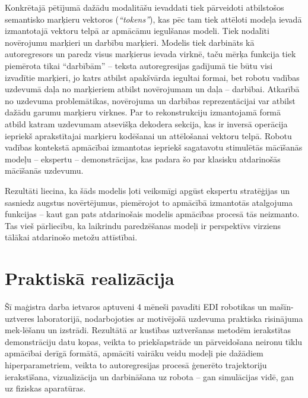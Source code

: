 \documentclass[12pt, a4paper]{article}
\numberwithin{equation}{section} %
\begin{document}
Konkrētajā pētījumā dažādu modalitāšu ievaddati tiek pārveidoti atbilstošos semantisko marķieru vektoros (\textit{``tokens''}), kas pēc tam tiek attēloti modeļa ievadā izmantotajā vektoru telpā ar apmācāmu iegulšanas modeli. Tiek nodalīti novērojumu marķieri un darbību marķieri. Modelis tiek darbināts kā autoregresors un paredz visus marķierus ievada virknē, taču mērķa funkcija tiek piemērota tikai ``darbībām'' -- teksta autoregresijas gadījumā tie būtu visi izvadītie marķieri, jo katrs atbilst apakšvārda iegultai formai, bet robotu vadības uzdevumā daļa no marķieriem atbilst novērojumam un daļa -- darbībai. Atkarībā no uzdevuma problemātikas, novērojuma un darbības reprezentācijai var atbilst dažādu garumu marķieru virknes. Par to rekonstrukciju izmantojamā formā atbild katram uzdevumam atsevišķa dekodera sekcija, kas ir inversā operācija iepriekš aprakstītajai marķieru kodēšanai un attēlošanai vektoru telpā. Robotu vadības kontekstā apmācībai izmantotas iepriekš sagatavotu stimulētās mācīšanās modeļu -- ekspertu -- demonstrācijas, kas padara šo par klasisku atdarinošās mācīšanās uzdevumu. 

Rezultāti liecina, ka šāds modelis ļoti veiksmīgi apgūst ekspertu stratēģijas un sasniedz augstus novērtējumus, piemērojot to apmācībā izmantotās atalgojuma funkcijas -- kaut gan pats atdarinošais modelis apmācības procesā tās neizmanto. Tas vieš pārliecību, ka laikrindu paredzēšanas modeļi ir perspektīvs virziens tālākai atdarinošo metožu attīstībai.



%
%
%
%
%
%
%
%
%
%
%
%
%
%
%
%
%
%
%

\newpage
\section{Praktiskā realizācija}

Šī maģistra darba ietvaros aptuveni 4 mēneši pavadīti EDI robotikas un mašīn-uztveres laboratorijā, nodarbojoties ar motivējošā uzdevuma praktiska risinājuma mek-lēšanu un izstrādi. Rezultātā ar kustības uztveršanas metodēm ierakstītas demonstrāciju datu kopas, veikta to priekšapstrāde un pārveidošana neironu tīklu apmācībai derīgā formātā, apmācīti vairāku veidu modeļi pie dažādiem hiperparametriem, veikta to autoregresijas procesā ģenerēto trajektoriju ierakstīšana, vizualizācija un darbināšana uz robota -- gan simulācijas vidē, gan uz fiziskas aparatūras.
\end{document}

